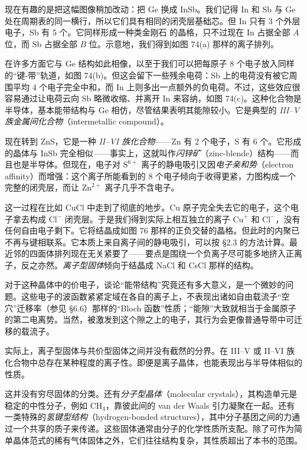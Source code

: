 现在有趣的是把这幅图像稍加改动：把 Ge 换成 InSb。我们记得 In 和 Sb 与 Ge 处在周期表的同一横行，所以它们具有相同的闭壳层基础芯。但 In 只有 3 个外层电子，Sb 有 5 个。它同样形成一种类金刚石
的晶格，只不过现在 In 占据全部 $A$ 位，而 Sb 占据全部 $B$ 位。示意地，我们得到如图 74(a) 那样的离子排列。

在许多方面它与 Ge 结构如此相像，以至于我们可以把每原子 8 个电子放入同样的“键-带”轨道，如图 74(b)。但这会留下一些残余电荷：Sb 上的电荷没有被它周围平均 4 个电子完全中和，而 In 上则多出一点额外的负电荷。不过，这些效应很容易通过让电荷云向 Sb 略微收缩、并离开 In 来容纳，如图 74(c)。这种化合物是半导体，基本能带结构与 Ge 相仿，尽管结果表明其能隙较小。它是典型的 \emph{III–V 族金属间化合物}（intermetallic compound）。

现在转到 ZnS，它是一种 \emph{II–VI 族化合物}——Zn 有 2 个电子，S 有 6 个。它形成的晶体与 InSb 完全相似——事实上，这就叫作\emph{闪锌矿}（zinc-blende）结构——而且也是半导体。但现在，电子对 $\mathrm{S}^{6+}$ 离子的静电吸引又因\emph{电子亲和势}（electron affinity）而增强：这个离子所能看到的 8 个电子倾向于收得更紧，力图构成一个完整的闭壳层，而让 $\mathrm{Zn}^{2+}$ 离子几乎不含电子。


这一过程在比如 CuCl 中走到了彻底的地步。Cu 原子完全失去它的电子，这个电子拿去构成 $\mathrm{Cl}^{-}$ 闭壳层。于是我们得到实际上相互独立的离子 $\mathrm{Cu}^{+}$ 和 $\mathrm{Cl}^{-}$，没有任何自由电子剩下。它将结晶成如图 76 那样的正负交替的晶格。但此时的内聚已不再与键相联系。它本质上来自离子间的静电吸引，可以按 §2.3 的方法计算。最近邻的四面体排列现在无关紧要了——要点是围绕一个负离子尽可能多地挤入正离子，反之亦然。\emph{离子型固体}倾向于结晶成 NaCl 和 CsCl 那样的结构。

对于这种晶体中的价电子，谈论“能带结构”究竟还有多大意义，是一个微妙的问题。这些电子的波函数紧紧定域在各自的离子上，不表现出诸如自由载流子“空穴”迁移率（参见 §6.6）那样的“Bloch 函数”性质；“能隙”大致就相当于金属原子的第二电离势。当然，被激发到这个隙之上的电子，其行为会更像普通导带中可迁移的载流子。

实际上，离子型固体与共价型固体之间并没有截然的分界。在 III–V 或 II–VI 族化合物中总存在某种程度的离子性。即便是离子晶体，也能表现出与半导体相似的性质。


这并没有穷尽固体的分类。还有\emph{分子型晶体}（molecular crystals），其构造单元是稳定的中性分子，例如 CH$_4$，靠彼此间的 van der Waals 引力凝聚在一起。还有一类特殊的\emph{氢键型结构}（hydrogen-bonded structures），其中分子基团之间的力通过一个共享的质子来传递。这些固体通常由分子的化学性质所支配。除了可作为简单晶体范式的稀有气体固体之外，它们往往结构复杂，其性质超出了本书的范围。
